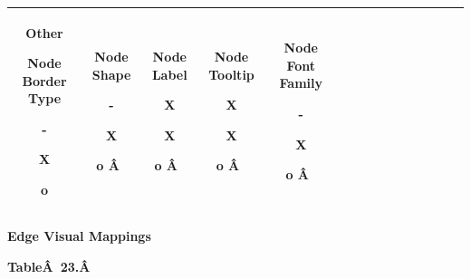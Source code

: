 \begin{tabular}{|c|c|c|c|c|c|c|c|c|c|c|c|c|c|c|}
 Other


  Node Border Type 


  - 


  X 


  o 
 &

  Node Shape 


  - 


  X 


  o 
\^A  &

  Node Label 


  X 


  X 


  o 
\^A  &

  Node Tooltip 


  X 


  X 


  o 
\^A  &

  Node Font Family 


  - 


  X 


  o 
\^A  \\
 \hline 

\end{tabular}



 \textbf{Edge Visual Mappings}



 \textbf{Table\^A 23.\^A }



